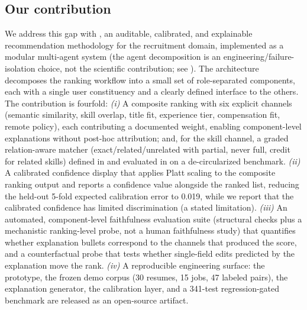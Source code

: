 \subsection{Our contribution}\label{sec:1.6}
We address this gap with \JobMatch, an auditable, calibrated, and explainable recommendation methodology for the recruitment domain, implemented as a modular multi-agent system (the agent decomposition is an engineering/failure-isolation choice, not the scientific contribution; see ).
The architecture decomposes the ranking workflow into a small set of role-separated components, each with a single user constituency and a clearly defined interface to the others.
The contribution is fourfold:
\emph{(i)} A composite ranking with six explicit channels (semantic similarity, skill overlap, title fit, experience tier, compensation fit, remote policy), each contributing a documented weight, enabling component-level explanations without post-hoc attribution; and, for the skill channel, a graded relation-aware matcher (exact/related/unrelated with partial, never full, credit for related skills) defined in  and evaluated in  on a de-circularized benchmark.
\emph{(ii)} A calibrated confidence display that applies Platt scaling \citep{platt1999probabilistic,guo2017calibration} to the composite ranking output and reports a confidence value alongside the ranked list, reducing the held-out 5-fold expected calibration error to 0.019, while we report that the calibrated confidence has limited discrimination (a stated limitation).
\emph{(iii)} An automated, component-level faithfulness evaluation suite (structural checks plus a mechanistic ranking-level probe, not a human faithfulness study) that quantifies whether explanation bullets correspond to the channels that produced the score, and a counterfactual probe that tests whether single-field edits predicted by the explanation move the rank.
\emph{(iv)} A reproducible engineering surface: the prototype, the frozen demo corpus (30 resumes, 15 jobs, 47 labeled pairs), the explanation generator, the calibration layer, and a 341-test regression-gated benchmark are released as an open-source artifact.

